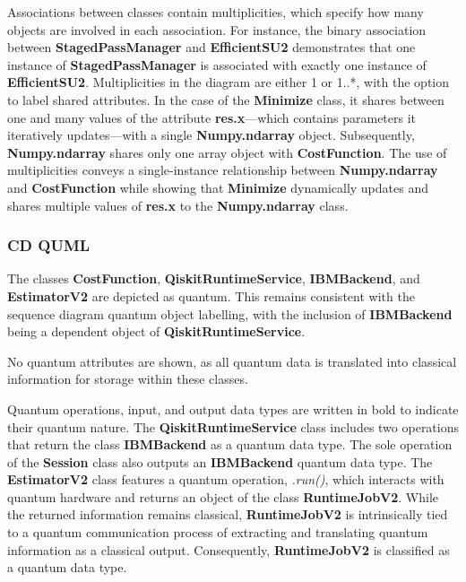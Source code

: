 \documentclass{article}
\begin{document}
Associations between classes contain multiplicities, which specify how many objects are involved in each association. For instance, the binary association between \textbf{StagedPassManager} and \textbf{EfficientSU2} demonstrates that one instance of \textbf{StagedPassManager} is associated with exactly one instance of \textbf{EfficientSU2}. Multiplicities in the diagram are either 1 or 1..*, with the option to label shared attributes. In the case of the \textbf{Minimize} class, it shares between one and many values of the attribute \textbf{res.x}—which contains parameters it iteratively updates—with a single \textbf{Numpy.ndarray} object. Subsequently, \textbf{Numpy.ndarray} shares only one array object with \textbf{CostFunction}. The use of multiplicities conveys a single-instance relationship between \textbf{Numpy.ndarray} and \textbf{CostFunction} while showing that \textbf{Minimize} dynamically updates and shares multiple values of \textbf{res.x} to the \textbf{Numpy.ndarray} class.

\subsubsection{CD QUML}

The classes \textbf{CostFunction}, \textbf{QiskitRuntimeService}, \textbf{IBMBackend}, and \textbf{EstimatorV2} are depicted as quantum. This remains consistent with the sequence diagram quantum object labelling, with the inclusion of \textbf{IBMBackend} being a dependent object of \textbf{QiskitRuntimeService}.

No quantum attributes are shown, as all quantum data is translated into classical information for storage within these classes.

Quantum operations, input, and output data types are written in bold to indicate their quantum nature. The \textbf{QiskitRuntimeService} class includes two operations that return the class \textbf{IBMBackend} as a quantum data type. The sole operation of the \textbf{Session} class also outputs an \textbf{IBMBackend} quantum data type. The \textbf{EstimatorV2} class features a quantum operation, \textit{.run()}, which interacts with quantum hardware and returns an object of the class \textbf{RuntimeJobV2}. While the returned information remains classical, \textbf{RuntimeJobV2} is intrinsically tied to a quantum communication process of extracting and translating quantum information as a classical output. Consequently, \textbf{RuntimeJobV2} is classified as a quantum data type.
\end{document}
